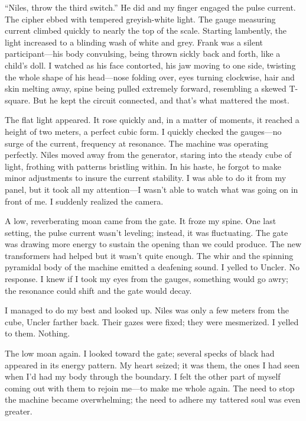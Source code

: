 ``Niles, throw the third switch.'' He did and my finger engaged the
pulse current. The cipher ebbed with tempered greyish-white light. The
gauge measuring current climbed quickly to nearly the top of the scale.
Starting lambently, the light increased to a blinding wash of white and
grey. Frank was a silent participant---his body convulsing, being thrown
sickly back and forth, like a child's doll. I watched as his face
contorted, his jaw moving to one side, twisting the whole shape of his
head---nose folding over, eyes turning clockwise, hair and skin melting
away, spine being pulled extremely forward, resembling a skewed
T-square. But he kept the circuit connected, and that's what mattered
the most.

The flat light appeared. It rose quickly and, in a matter of moments, it
reached a height of two meters, a perfect cubic form. I quickly checked
the gauges---no surge of the current, frequency at resonance. The
machine was operating perfectly. Niles moved away from the generator,
staring into the steady cube of light, frothing with patterns bristling
within. In his haste, he forgot to make minor adjustments to insure the
current stability. I was able to do it from my panel, but it took all my
attention---I wasn't able to watch what was going on in front of me. I
suddenly realized the camera.

A low, reverberating moan came from the gate. It froze my spine. One
last setting, the pulse current wasn't leveling; instead, it was
fluctuating. The gate was drawing more energy to sustain the opening
than we could produce. The new transformers had helped but it wasn't
quite enough. The whir and the spinning pyramidal body of the machine
emitted a deafening sound. I yelled to Uncler. No response. I knew if I
took my eyes from the gauges, something would go awry; the resonance
could shift and the gate would decay.

I managed to do my best and looked up. Niles was only a few meters from
the cube, Uncler farther back. Their gazes were fixed; they were
mesmerized. I yelled to them. Nothing.

The low moan again. I looked toward the gate; several specks of black
had appeared in its energy pattern. My heart seized; it was them, the
ones I had seen when I'd had my body through the boundary. I felt the
other part of myself coming out with them to rejoin me---to make me
whole again. The need to stop the machine became overwhelming; the need
to adhere my tattered soul was even greater.

